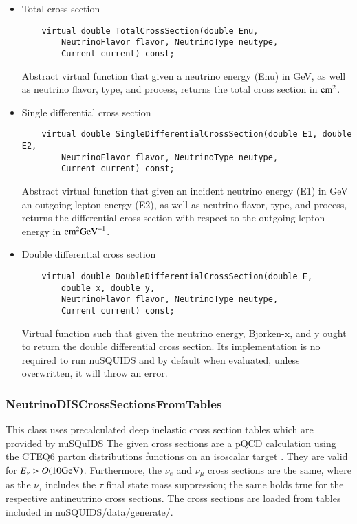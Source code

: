 \begin{itemize}
  \item Total cross section
  \begin{lstlisting}
    virtual double TotalCrossSection(double Enu,
    	NeutrinoFlavor flavor, NeutrinoType neutype,
    	Current current) const;
  \end{lstlisting}
  Abstract virtual function that given a neutrino energy ({\ttf Enu}) in GeV, as well as neutrino flavor, type, and process, returns the 
  total cross section in ${\rm cm}^2$.
  \item Single differential cross section
  \begin{lstlisting}
    virtual double SingleDifferentialCrossSection(double E1, double E2,
    	NeutrinoFlavor flavor, NeutrinoType neutype,
    	Current current) const;
  \end{lstlisting}
  Abstract virtual function that given an incident neutrino energy ({\ttf E1}) in GeV an outgoing lepton
   energy ({\ttf E2}), as well as neutrino flavor, type, and process, returns the differential cross section with respect to the outgoing lepton energy in ${\rm cm}^2 {\rm GeV}^{-1}$.
  \item Double differential cross section
  \begin{lstlisting}
    virtual double DoubleDifferentialCrossSection(double E, 
        double x, double y,
    	NeutrinoFlavor flavor, NeutrinoType neutype,
    	Current current) const;
  \end{lstlisting}
  Virtual function such that given the neutrino energy, Bjorken-x, and y ought to return the double
   differential cross section. Its implementation is no required to run {\ttf nuSQUIDS} and by default when evaluated, unless overwritten, it will throw an error.
\end{itemize}

\subsubsection{NeutrinoDISCrossSectionsFromTables}

This class uses precalculated deep inelastic cross section tables which are provided by {\ttf nuSQuIDS} The given cross sections are a pQCD calculation using the CTEQ6 parton distributions functions on an isoscalar target . They are valid for $E_\nu > O({\rm 10 GeV}) $. Furthermore, the $\nu_e$ and $\nu_\mu$ cross sections are the same, where as the $\nu_\tau$ includes the $\tau$ final state mass suppression; the same holds true for the respective antineutrino cross sections. The cross sections are loaded from tables included in {\ttfamily nuSQUIDS/data/generate/}. 

